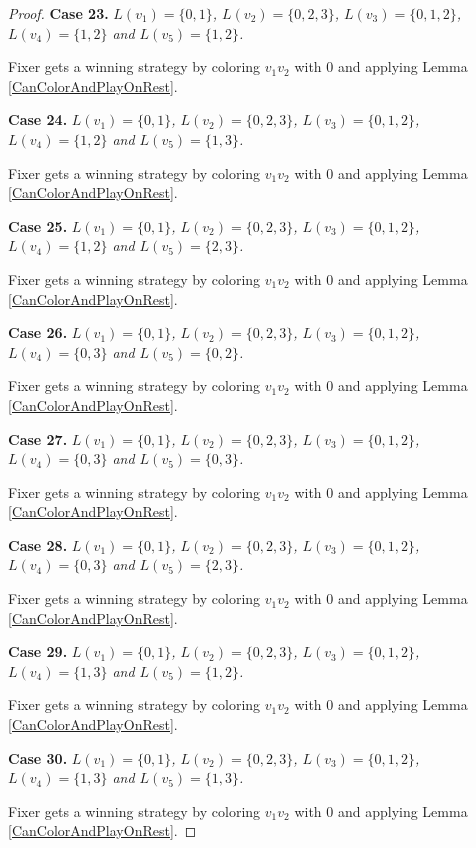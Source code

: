 \documentclass[12pt]{amsart}
\theoremstyle{plain}
\theoremstyle{definition}
\theoremstyle{remark}
\begin{document}
\begin{proof}
\noindent\textbf{Case 23.  }\textit{$L(v_1) = \{0, 1\}$, $L(v_2) = \{0, 2, 3\}$, $L(v_3) = \{0, 1, 2\}$, $L(v_4) = \{1, 2\}$ and $L(v_5) = \{1, 2\}$.}

Fixer gets a winning strategy by coloring $v_1v_2$ with $0$ and applying Lemma \ref{CanColorAndPlayOnRest}.

\noindent\textbf{Case 24.  }\textit{$L(v_1) = \{0, 1\}$, $L(v_2) = \{0, 2, 3\}$, $L(v_3) = \{0, 1, 2\}$, $L(v_4) = \{1, 2\}$ and $L(v_5) = \{1, 3\}$.}

Fixer gets a winning strategy by coloring $v_1v_2$ with $0$ and applying Lemma \ref{CanColorAndPlayOnRest}.

\noindent\textbf{Case 25.  }\textit{$L(v_1) = \{0, 1\}$, $L(v_2) = \{0, 2, 3\}$, $L(v_3) = \{0, 1, 2\}$, $L(v_4) = \{1, 2\}$ and $L(v_5) = \{2, 3\}$.}

Fixer gets a winning strategy by coloring $v_1v_2$ with $0$ and applying Lemma \ref{CanColorAndPlayOnRest}.

\noindent\textbf{Case 26.  }\textit{$L(v_1) = \{0, 1\}$, $L(v_2) = \{0, 2, 3\}$, $L(v_3) = \{0, 1, 2\}$, $L(v_4) = \{0, 3\}$ and $L(v_5) = \{0, 2\}$.}

Fixer gets a winning strategy by coloring $v_1v_2$ with $0$ and applying Lemma \ref{CanColorAndPlayOnRest}.

\noindent\textbf{Case 27.  }\textit{$L(v_1) = \{0, 1\}$, $L(v_2) = \{0, 2, 3\}$, $L(v_3) = \{0, 1, 2\}$, $L(v_4) = \{0, 3\}$ and $L(v_5) = \{0, 3\}$.}

Fixer gets a winning strategy by coloring $v_1v_2$ with $0$ and applying Lemma \ref{CanColorAndPlayOnRest}.

\noindent\textbf{Case 28.  }\textit{$L(v_1) = \{0, 1\}$, $L(v_2) = \{0, 2, 3\}$, $L(v_3) = \{0, 1, 2\}$, $L(v_4) = \{0, 3\}$ and $L(v_5) = \{2, 3\}$.}

Fixer gets a winning strategy by coloring $v_1v_2$ with $0$ and applying Lemma \ref{CanColorAndPlayOnRest}.

\noindent\textbf{Case 29.  }\textit{$L(v_1) = \{0, 1\}$, $L(v_2) = \{0, 2, 3\}$, $L(v_3) = \{0, 1, 2\}$, $L(v_4) = \{1, 3\}$ and $L(v_5) = \{1, 2\}$.}

Fixer gets a winning strategy by coloring $v_1v_2$ with $0$ and applying Lemma \ref{CanColorAndPlayOnRest}.

\noindent\textbf{Case 30.  }\textit{$L(v_1) = \{0, 1\}$, $L(v_2) = \{0, 2, 3\}$, $L(v_3) = \{0, 1, 2\}$, $L(v_4) = \{1, 3\}$ and $L(v_5) = \{1, 3\}$.}

Fixer gets a winning strategy by coloring $v_1v_2$ with $0$ and applying Lemma \ref{CanColorAndPlayOnRest}.


\end{proof}
\end{document}
